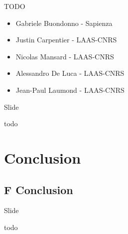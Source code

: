 \documentclass[french,ignorenonframetext,]{beamer}
\providecommand{\tightlist}{%
  \setlength{\itemsep}{0pt}\setlength{\parskip}{0pt}}
\begin{document}
TODO

\begin{itemize}
\tightlist
\item
  Gabriele Buondonno - Sapienza
\item
  Justin Carpentier - LAAS-CNRS
\item
  Nicolas Mansard - LAAS-CNRS
\item
  Alessandro De Luca - LAAS-CNRS
\item
  Jean-Paul Laumond - LAAS-CNRS
\end{itemize}

\begin{frame}{Slide}

todo

\end{frame}

\section{Conclusion}\label{conclusion}

\subsection{F Conclusion}\label{f-conclusion}

\begin{frame}{Slide}

todo

\end{frame}
\end{document}
